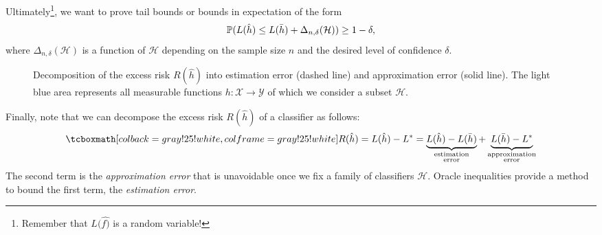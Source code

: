 Ultimately\footnote{Remember that $L(\hat{f)}$ is a random variable!}, we want to prove tail bounds or bounds in expectation of the form
\[
    \P(L(\hat{h}) \leq L(\bar{h}) + \Delta_{n, \delta}(\mathcal{H})) \geq 1 - \delta,
\]
where $\Delta_{n, \delta}(\mathcal{H})$ is a function of $\mathcal{H}$ depending on the sample size $n$ and the desired level of confidence $\delta$.

\begin{figure}
    \centering
    \caption{%
        Decomposition of the excess risk $R(\hat{h})$ into estimation error (dashed line) and approximation error (solid line). The light blue area represents all measurable functions $h \colon \mathcal{X} \to \mathcal{Y}$ of which we consider a subset $\mathcal{H}$.
    }
    \label{fig: estimation vs approximation error}
\end{figure}

Finally, note that we can decompose the excess risk $R(\hat{h})$ of a classifier as follows:
\[
    \highlightMath{
        R(\hat{h}) = L(\hat{h}) - L^* = \underbrace{L(\hat{h}) - L(\bar{h})}_{\substack{\text{estimation} \\ \text{error}}} + \underbrace{L(\bar{h}) - L^*}_{\substack{\text{approximation} \\ \text{error}}}
    }
\]
The second term is the \emph{approximation error} that is unavoidable once we fix a family of classifiers $\mathcal{H}$. Oracle inequalities provide a method to bound the first term, the \emph{estimation error}.
